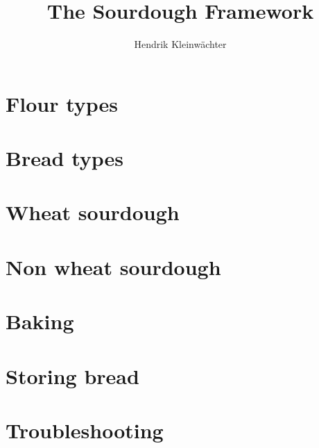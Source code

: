 \documentclass[paper=a4, twoside=false, fontsize=12pt, parskip=half,
                bibliography=totoc, listof=totoc]{scrbook}
\author{Hendrik Kleinwächter}
\title{The Sourdough Framework}
\begin{document}

\titlepage

\frontmatter
{%
\hypersetup{hidelinks}
\ifdefined\HCode\else\tableofcontents\fi
}





\mainmatter









\chapter{Flour types}


\chapter{Bread types}


\chapter{Wheat sourdough}%
\label{chapter:wheat-sourdough}


\chapter{Non wheat sourdough}%
\label{chapter:non-wheat-sourdough}


% 
\chapter{Baking}%
\label{chapter:baking}


\chapter{Storing bread}%
\label{chapter:storing-bread}


\chapter{Troubleshooting}


\backmatter
\printbibliography
{%
\hypersetup{hidelinks}
\listofflowcharts
\listoftables
\listoffigures
}
\end{document}
